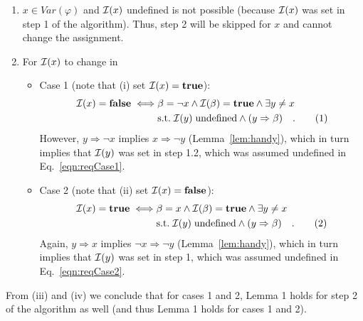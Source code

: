 \documentclass [11pt]{article}
\newcommand{\Ra}{\Rightarrow}
\renewcommand{\phi}{\varphi}
\def\II{{\cal I}}
\newcommand{\True}{\mathbf{true}}
\newcommand{\False}{\mathbf{false}}
\def\ox{\neg x}
\def\oy{\neg y}
\def\b{\beta}
\newcommand\numberthis{\addtocounter{equation}{1}\tag{\theequation}}
\newcommand\neqn[1]{\numberthis\label{eqn:#1}}
\begin{document}
\begin{enumerate}[label=(\roman*),resume]
\item $x \in Var(\phi)$ and $\II(x)$ undefined is not possible (because $\II(x)$ was set in step 1 of the algorithm). Thus, step 2 will be skipped for $x$ and cannot change the assignment.
\item For $\II(x)$ to change in 
\begin{itemize}
\item Case 1 (note that (i) set $\II(x) = \True$): 
\begin{align}
\II(x) = \False \iff &\b = \ox \land \II(\b) = \True \land \exists y\neq x\; \\
& \mathrm{s.t.}\; \II(y)\; \mathrm{undefined} \land (y \Ra \b)\quad . \neqn{reqCase1}
\end{align}
However, $y \Ra \ox$ implies $x \Ra \oy$ (Lemma~\ref{lem:handy}), which in turn implies that $\II(y)$ was set in step 1.2, which was assumed undefined in Eq.~\ref{eqn:reqCase1}.
\item Case 2 (note that (ii) set $\II(x) = \False$): 
\begin{align}
\II(x) = \True \iff &\b = x \land \II(\b) = \True \land \exists y\neq x\; \\
& \mathrm{s.t.}\; \II(y)\; \mathrm{undefined} \land (y \Ra \b)\quad . \neqn{reqCase2}
\end{align}
Again, $y \Ra x$ implies $\ox \Ra \oy$ (Lemma~\ref{lem:handy}), which in turn implies that $\II(y)$ was set in step 1, which was assumed undefined in Eq.~\ref{eqn:reqCase2}.
\end{itemize}
\end{enumerate}
From (iii) and (iv) we conclude that for cases 1 and 2, Lemma 1 holds for step 2 of the algorithm as well (and thus Lemma 1 holds for cases 1 and 2).
\end{document}
